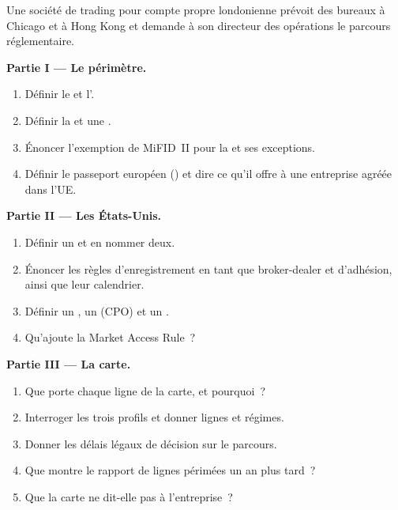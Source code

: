 \begin{problem}\label{pb:fm:regulators-and-licences:1}
Une société de trading pour compte propre londonienne prévoit des bureaux à Chicago et à Hong Kong et demande à son directeur des opérations le parcours réglementaire.

\medskip\noindent\textbf{Partie I --- Le périmètre.}
\begin{enumerate}
\item Définir le  et l'.
\item Définir la  et une .
\item Énoncer l'exemption de MiFID~II pour la  et ses exceptions.
\item Définir le passeport européen () et dire ce qu'il offre à une entreprise agréée dans l'UE.
\end{enumerate}

\medskip\noindent\textbf{Partie II --- Les États-Unis.}
\begin{enumerate}[resume]
\item Définir un  et en nommer deux.
\item Énoncer les règles d'enregistrement en tant que broker-dealer et d'adhésion, ainsi que leur calendrier.
\item Définir un , un  (CPO) et un .
\item Qu'ajoute la Market Access Rule~?
\end{enumerate}

\medskip\noindent\textbf{Partie III --- La carte.}
\begin{enumerate}[resume]
\item Que porte chaque ligne de la carte, et pourquoi~?
\item Interroger les trois profils et donner lignes et régimes.
\item Donner les délais légaux de décision sur le parcours.
\item Que montre le rapport de lignes périmées un an plus tard~?
\item Que la carte ne dit-elle pas à l'entreprise~?
\end{enumerate}


\end{problem}
